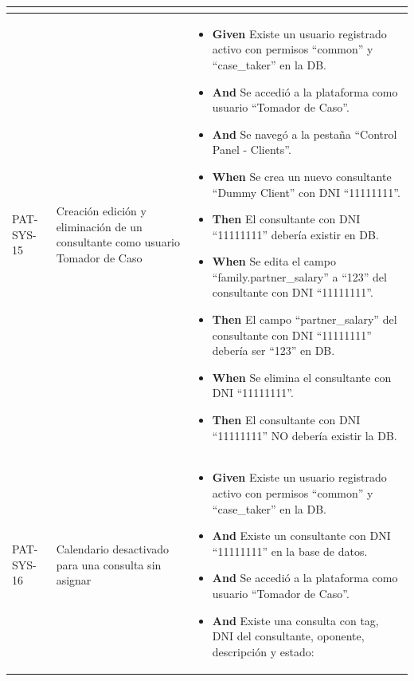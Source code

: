 \begin{longtable}{|p{1cm}|p{2.5cm}|p{12cm}|}
\begin{itemize}
    \end{itemize}
    \\
    \hline
    PAT-SYS-15 & Creación edición y eliminación de un consultante como usuario Tomador de Caso & 
    \begin{itemize}
        \item \textbf{Given} Existe un usuario registrado activo con permisos ``common'' y ``case\_taker'' en la DB.
        \item \textbf{And} Se accedió a la plataforma como usuario ``Tomador de Caso''.
        \item \textbf{And} Se navegó a la pestaña ``Control Panel - Clients''.
        \newline
        \item \textbf{When}  Se crea un nuevo consultante ``Dummy Client'' con DNI ``11111111''.
        \newline
        \item \textbf{Then} El consultante con DNI ``11111111'' deber\'ia existir en DB.
        \newline
        \item \textbf{When} Se edita el campo ``family.partner\_salary'' a ``123'' del consultante con DNI ``11111111''.
        \newline
        \item \textbf{Then} El campo ``partner\_salary'' del consultante con DNI ``11111111'' deber\'ia ser ``123'' en DB.
        \newline
        \item \textbf{When} Se elimina el consultante con DNI ``11111111''.
        \newline
        \item \textbf{Then} El consultante con DNI ``11111111'' NO deber\'ia existir la DB.
    \end{itemize}
    \\
     \hline
    PAT-SYS-16 & Calendario desactivado para una consulta sin asignar & 
    \begin{itemize}
        \item \textbf{Given} Existe un usuario registrado activo con permisos ``common'' y ``case\_taker'' en la DB.
        \item \textbf{And} Existe un consultante con DNI ``11111111'' en la base de datos.
        \item \textbf{And} Se accedió a la plataforma como usuario ``Tomador de Caso''.
        \item \textbf{And} Existe una consulta con tag, DNI del consultante, oponente, descripción y estado:

\end{itemize}
\end{longtable}
